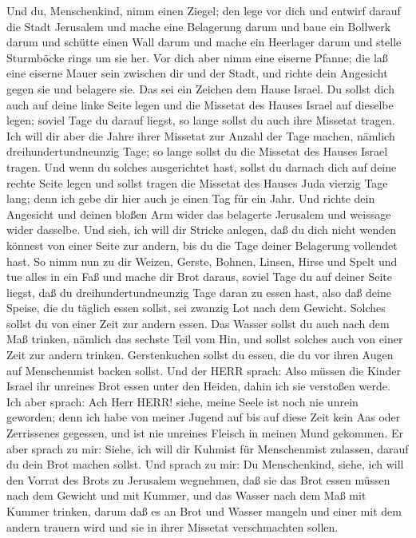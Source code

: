  Und du, Menschenkind, nimm einen Ziegel; den lege vor dich
und entwirf darauf die Stadt Jerusalem  und mache eine
Belagerung darum und baue ein Bollwerk darum und schütte einen Wall
darum und mache ein Heerlager darum und stelle Sturmböcke rings um sie
her.  Vor dich aber nimm eine eiserne Pfanne; die laß eine
eiserne Mauer sein zwischen dir und der Stadt, und richte dein Angesicht
gegen sie und belagere sie. Das sei ein Zeichen dem Hause Israel.
 Du sollst dich auch auf deine linke Seite legen und die
Missetat des Hauses Israel auf dieselbe legen; soviel Tage du darauf
liegst, so lange sollst du auch ihre Missetat tragen.  Ich
will dir aber die Jahre ihrer Missetat zur Anzahl der Tage machen,
nämlich dreihundertundneunzig Tage; so lange sollst du die Missetat des
Hauses Israel tragen.  Und wenn du solches ausgerichtet
hast, sollst du darnach dich auf deine rechte Seite legen und sollst
tragen die Missetat des Hauses Juda vierzig Tage lang; denn ich gebe dir
hier auch je einen Tag für ein Jahr.  Und richte dein
Angesicht und deinen bloßen Arm wider das belagerte Jerusalem und
weissage wider dasselbe.  Und sieh, ich will dir Stricke
anlegen, daß du dich nicht wenden könnest von einer Seite zur andern,
bis du die Tage deiner Belagerung vollendet hast.  So nimm
nun zu dir Weizen, Gerste, Bohnen, Linsen, Hirse und Spelt und tue alles
in ein Faß und mache dir Brot daraus, soviel Tage du auf deiner Seite
liegst, daß du dreihundertundneunzig Tage daran zu essen hast,
 also daß deine Speise, die du täglich essen sollst, sei
zwanzig Lot nach dem Gewicht. Solches sollst du von einer Zeit zur
andern essen.  Das Wasser sollst du auch nach dem Maß
trinken, nämlich das sechste Teil vom Hin, und sollst solches auch von
einer Zeit zur andern trinken.  Gerstenkuchen sollst du
essen, die du vor ihren Augen auf Menschenmist backen sollst.
 Und der HERR sprach: Also müssen die Kinder Israel ihr
unreines Brot essen unter den Heiden, dahin ich sie verstoßen werde.
 Ich aber sprach: Ach Herr HERR! siehe, meine Seele ist
noch nie unrein geworden; denn ich habe von meiner Jugend auf bis auf
diese Zeit kein Aas oder Zerrissenes gegessen, und ist nie unreines
Fleisch in meinen Mund gekommen.  Er aber sprach zu mir:
Siehe, ich will dir Kuhmist für Menschenmist zulassen, darauf du dein
Brot machen sollst.  Und sprach zu mir: Du Menschenkind,
siehe, ich will den Vorrat des Brots zu Jerusalem wegnehmen, daß sie das
Brot essen müssen nach dem Gewicht und mit Kummer, und das Wasser nach
dem Maß mit Kummer trinken,  darum daß es an Brot und
Wasser mangeln und einer mit dem andern trauern wird und sie in ihrer
Missetat verschmachten sollen.

